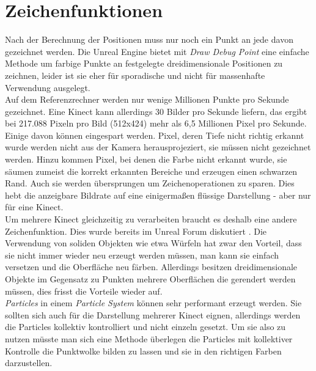 \documentclass[a4paper]{IEEEtran}
\begin{document}
\section{Zeichenfunktionen}
\label{zeichnen}
	Nach der Berechnung der Positionen muss nur noch ein Punkt an jede davon gezeichnet werden. 
	Die Unreal Engine bietet mit {\textit{Draw Debug Point}} eine einfache Methode um farbige Punkte an festgelegte dreidimensionale Positionen zu zeichnen, leider ist sie eher für sporadische und nicht für massenhafte Verwendung ausgelegt. \\
	Auf dem Referenzrechner werden nur wenige Millionen Punkte pro Sekunde gezeichnet. 
	Eine Kinect kann allerdings 30 Bilder pro Sekunde liefern, das ergibt bei 217.088 Pixeln pro Bild (512x424) mehr als 6,5 Millionen Pixel pro Sekunde. \\
	Einige davon können eingespart werden. 
	Pixel, deren Tiefe nicht richtig erkannt wurde werden nicht aus der Kamera herausprojeziert, sie müssen nicht gezeichnet werden. 
	Hinzu kommen Pixel, bei denen die Farbe nicht erkannt wurde, sie säumen zumeist die korrekt erkannten Bereiche und erzeugen einen schwarzen Rand. 
	Auch sie werden übersprungen um Zeichenoperationen zu sparen. 
	Dies hebt die anzeigbare Bildrate auf eine einigermaßen flüssige Darstellung - aber nur für eine Kinect. \\
	Um mehrere Kinect gleichzeitig zu verarbeiten braucht es deshalb eine andere Zeichenfunktion.
	Dies wurde bereits im Unreal Forum diskutiert {\cite{lidar}}.
	Die Verwendung von soliden Objekten wie etwa Würfeln hat zwar den Vorteil, dass sie nicht immer wieder neu erzeugt werden müssen, man kann sie einfach versetzen und die Oberfläche neu färben. 
	Allerdings besitzen dreidimensionale Objekte im Gegensatz zu Punkten mehrere Oberflächen die gerendert werden müssen, dies frisst die Vorteile wieder auf.\\
	{\textit{Particles}} in einem {\textit{Particle System}} können sehr performant erzeugt werden. 
	Sie sollten sich auch für die Darstellung mehrerer Kinect eignen, allerdings werden die Particles kollektiv kontrolliert und nicht einzeln gesetzt. 
	Um sie also zu nutzen müsste man sich eine Methode überlegen die Particles mit kollektiver Kontrolle die Punktwolke bilden zu lassen und sie in den richtigen Farben darzustellen. \\[0.5cm]
	
	
\end{document}
